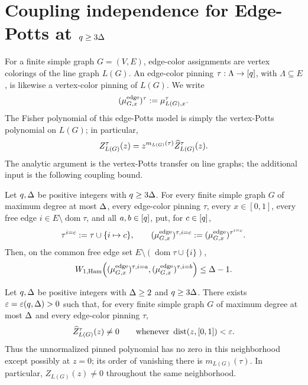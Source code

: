 \section{\texorpdfstring{Coupling independence for Edge-Potts at \(q\ge3\Delta\)}
{Coupling independence for Edge-Potts at q >= 3 Delta}}
\label{sec:soft-edge}
\label{app:soft-edge-ci}

For a finite simple graph \(G=(V,E)\), edge-color assignments are vertex
colorings of the line graph \(L(G)\).  An edge-color pinning
\(\tau:\Lambda\to[q]\), with \(\Lambda\subseteq E\), is likewise a
vertex-color pinning of \(L(G)\).  We write
\[
  (\mu^{\mathrm{edge}}_{G,x})^\tau:=\mu_{L(G),x}^{\tau}.
\]
The Fisher polynomial of this edge-Potts model is simply the vertex-Potts
polynomial on \(L(G)\); in particular,
\begin{equation}\label{eq:edge-normalization}
  Z_{L(G)}^{\tau}(z)
  =z^{m_{L(G)}(\tau)}\widehat Z_{L(G)}^{\tau}(z).
\end{equation}
The analytic argument is the vertex-Potts transfer on line graphs; the
additional input is the following coupling bound.

\begin{theorem}
\label{thm:soft-edge-ci}
Let \(q,\Delta\) be positive integers with \(q\ge3\Delta\).  For every finite simple graph \(G\)
of maximum degree at most \(\Delta\), every edge-color pinning \(\tau\),
every \(x\in[0,1]\), every free edge
\(i\in E\setminus\operatorname{dom}\tau\), and all
\(a,b\in[q]\), put, for \(c\in[q]\),
\[
  \tau^{i=c}:=\tau\cup\{i\mapsto c\},
  \qquad
  (\mu^{\mathrm{edge}}_{G,x})^{\tau,i=c}
  :=(\mu^{\mathrm{edge}}_{G,x})^{\tau^{i=c}}.
\]
Then, on the common free edge set \(E\setminus(\operatorname{dom}\tau\cup\{i\})\),
\begin{equation}\label{eq:soft-edge-ci}
  W_{1,\operatorname{Ham}}\!\left(
    (\mu^{\mathrm{edge}}_{G,x})^{\tau,i=a},
    (\mu^{\mathrm{edge}}_{G,x})^{\tau,i=b}
  \right)
  \le\Delta-1.
\end{equation}
\end{theorem}

\begin{corollary}
\label{cor:soft-edge-zf}
Let \(q,\Delta\) be positive integers with \(\Delta\ge2\) and
\(q\ge3\Delta\).  There exists
\(\varepsilon=\varepsilon(q,\Delta)>0\) such that, for every finite simple graph \(G\) of
maximum degree at most \(\Delta\) and every edge-color pinning \(\tau\),
\[
  \widehat Z_{L(G)}^{\tau}(z)\ne0
  \qquad\text{whenever }\operatorname{dist}(z,[0,1])<\varepsilon.
\]
Thus the unnormalized pinned polynomial has no zero in this neighborhood
except possibly at \(z=0\); its order of vanishing there is
\(m_{L(G)}(\tau)\).  In particular,
\(Z_{L(G)}(z)\ne0\) throughout the same neighborhood.
\end{corollary}


